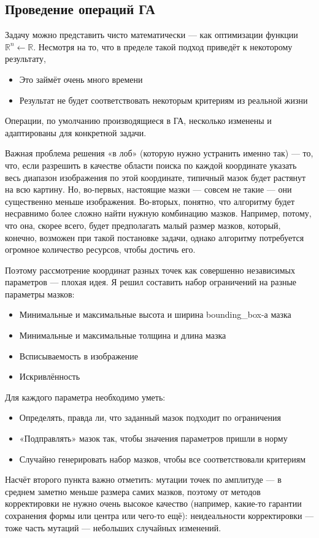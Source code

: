 \subsection{Проведение операций ГА}\label{subsec:ga-operations}

Задачу можно представить чисто математически — как оптимизации функции $\mathbb{R}^n \longleftarrow \mathbb{R}$.
Несмотря на то, что в пределе такой подход приведёт к некоторому результату,
\begin{itemize}
    \item Это займёт очень много времени
    \item Результат не будет соответствовать некоторым критериям из реальной жизни
\end{itemize}

Операции, по умолчанию производящиеся в ГА, несколько изменены и адаптированы для конкретной задачи.



Важная проблема решения «в лоб» (которую нужно устранить именно так) — то, что, если разрешить в качестве области поиска
по каждой координате указать весь диапазон изображения по этой координате, типичный мазок будет растянут на всю картину.
Но, во-первых, настоящие мазки — совсем не такие — они существенно меньше изображения.
Во-вторых, понятно, что алгоритму будет несравнимо более сложно найти нужную комбинацию мазков.
Например, потому, что она, скорее всего, будет предполагать малый размер мазков, который, конечно,
возможен при такой постановке задачи, однако алгоритму потребуется огромное количество ресурсов, чтобы достичь его.

Поэтому рассмотрение координат разных точек как совершенно независимых параметров — плохая идея.
Я решил составить набор ограничений на разные параметры мазков:
\begin{itemize}
    \item Минимальные и максимальные высота и ширина bounding\_box-а мазка
    \item Минимальные и максимальные толщина и длина мазка
    \item Всписываемость в изображение
    \item Искривлённость
\end{itemize}

Для каждого параметра необходимо уметь:
\begin{itemize}
    \item Определять, правда ли, что заданный мазок подходит по ограничения
    \item «Подправлять» мазок так, чтобы значения параметров пришли в норму
    \item Случайно генерировать набор мазков, чтобы все соответствовали критериям
\end{itemize}
Насчёт второго пункта важно отметить: мутации точек по амплитуде — в среднем заметно меньше размера самих мазков,
поэтому от методов корректировки не нужно очень высокое качество (например, какие-то гарантии сохранения формы или центра или чего-то ещё):
неидеальности корректировки — тоже часть мутаций — небольших случайных изменений.

